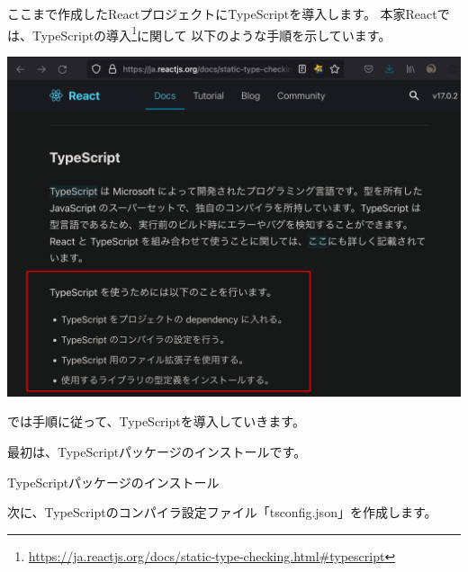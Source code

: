 ここまで作成したReactプロジェクトにTypeScriptを導入します。
本家Reactでは、TypeScriptの導入\footnote{\url{https://ja.reactjs.org/docs/static-type-checking.html\#typescript}}に関して
以下のような手順を示しています。

\begin{reviewimage}%
\includegraphics[width=0.8\maxwidth]{./images/02-create-react-app/typescript01.png}%
\label{image:02-create-react-app:typescript01}
\end{reviewimage}

では手順に従って、TypeScriptを導入していきます。

\vspace*{\baselineskip}

最初は、TypeScriptパッケージのインストールです。

\def\startercodeblockfontsize{}
\begin{starterterminal}[]{TypeScriptパッケージのインストール}\end{starterterminal}

次に、TypeScriptのコンパイラ設定ファイル「tsconfig.json」を作成します。

